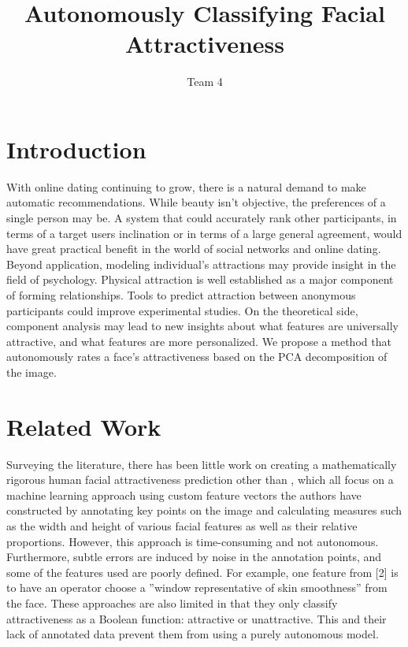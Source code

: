 \documentclass[10pt,twocolumn,letterpaper]{article}
\begin{document}
\title{Autonomously Classifying Facial Attractiveness}

\author{Team 4}

\maketitle


\section{Introduction}
With online dating continuing to grow, there is a natural
demand to make automatic recommendations. While
beauty isn’t objective, the preferences of a single person
may be. A system that could accurately rank other participants,
in terms of a target users inclination or in terms of a large general agreement, would have
great practical benefit in the world of social networks and online dating.
Beyond application, modeling individual’s attractions
may provide insight in the field of psychology. Physical
attraction is well established as a major component of forming
relationships. Tools to predict attraction between anonymous
participants could improve experimental studies. On
the theoretical side, component analysis may lead to new
insights about what features are universally attractive, and
what features are more personalized. We propose a method that 
autonomously rates a face's attractiveness based on the PCA decomposition of the image.
 
\section{Related Work}
Surveying the literature, there has been little work on
creating a mathematically rigorous human facial attractiveness
prediction other than \cite{eisenthal2006facial, kagian2006humanlike, kagian2008machine}, which all focus on a
machine learning approach using custom feature vectors
the authors have constructed by annotating key points on
the image and calculating measures such as the width and
height of various facial features as well as their relative proportions.
However, this approach is time-consuming and
not autonomous. Furthermore, subtle errors are induced by
noise in the annotation points, and some of the features used
are poorly defined. For example, one feature from [2] is to
have an operator choose a ”window representative of skin
smoothness” from the face. These approaches are also limited
in that they only classify attractiveness as a Boolean
function: attractive or unattractive. This and their 
lack of annotated data prevent them from using a purely autonomous model.
\end{document}
